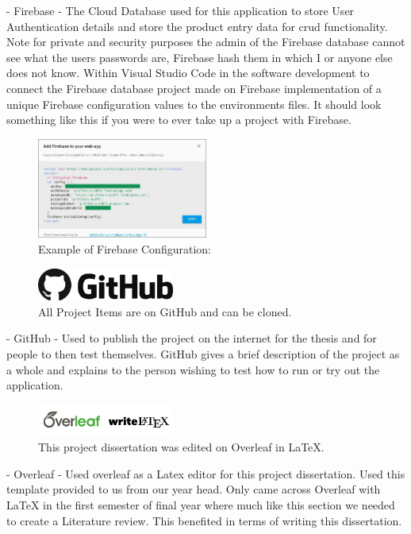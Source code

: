 - Firebase - The Cloud Database used for this application to store User Authentication details and store the product entry data for crud functionality. Note for private and security purposes the admin of the Firebase database cannot see what the users passwords are, Firebase hash them in which I or anyone else does not know. Within Visual Studio Code in the software development to connect the Firebase database project made on Firebase implementation of a  unique Firebase configuration values to the environments files. It should look something like this if you were to ever take up a project with Firebase.   
\newline

\begin{figure}[h!]
	\caption{Example of Firebase Configuration:}
	\label{image:firebaseConfig}
	\centering
	\includegraphics[width=0.5\textwidth]{images/firebaseConfig.jpg}
\end{figure}

\begin{figure}[h!]
	\caption{All Project Items are on GitHub and can be cloned.}
	\label{image:github1}
	\centering
	\includegraphics[width=0.4\textwidth]{images/github.png}
\end{figure}
\newpage
- GitHub - Used to publish the project on the internet for the thesis and for people to then test themselves. GitHub gives a brief description of the project as a whole and explains to the person wishing to test how to run or try out the application. 
\newline

\begin{figure}[h!]
	\caption{This project dissertation was edited on Overleaf in LaTeX.}
	\label{image:overleaf-latex}
	\centering
	\includegraphics[width=0.4\textwidth]{images/overleaf-latex.png}
\end{figure}
- Overleaf - Used overleaf as a Latex editor for this project dissertation. Used this template provided to us from our year head. Only came across Overleaf with LaTeX in the first semester of final year where much like this section we needed to create a Literature review. This benefited in terms of writing this dissertation.

